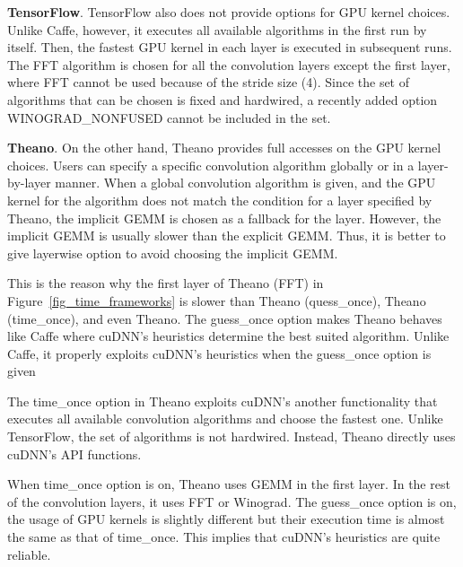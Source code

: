 {\bf TensorFlow}. TensorFlow also does not provide options for GPU kernel choices. Unlike Caffe, however, it executes all available algorithms in the first run by itself. Then, the fastest GPU kernel in each layer is executed in subsequent runs. The FFT algorithm is chosen for all the convolution layers except the first layer, where FFT cannot be used because of the stride size (4). Since the set of algorithms that can be chosen is fixed and hardwired, a recently added option WINOGRAD\_NONFUSED cannot be included in the set.

{\bf Theano}. On the other hand, Theano provides full accesses on the GPU kernel choices. Users can specify a specific convolution algorithm globally or in a layer-by-layer manner.  When a global convolution algorithm is given, and the GPU kernel for the algorithm does not match the condition for a layer specified by Theano, the implicit GEMM is chosen as a fallback for the layer. However, the implicit GEMM is usually slower than the explicit GEMM. Thus, it is better to give layerwise option to avoid choosing the implicit GEMM.

This is the reason why the first layer of \textsf{Theano (FFT)} in Figure~\ref{fig_time_frameworks} is slower than \textsf{Theano (quess\_once)}, \textsf{Theano (time\_once)}, and even \textsf{Theano}. The \textsf{guess\_once} option makes Theano behaves like Caffe where cuDNN's heuristics determine the best suited algorithm. Unlike Caffe, it properly exploits cuDNN's heuristics when the \textsf{guess\_once} option is given 

The \textsf{time\_once} option in Theano exploits cuDNN's another functionality that executes all available convolution algorithms and choose the fastest one. Unlike TensorFlow, the set of algorithms is not hardwired. Instead, Theano directly uses cuDNN's API functions.

When \textsf{time\_once} option is on, Theano uses GEMM in the first layer. In the rest of the convolution layers, it uses FFT or Winograd. The \textsf{guess\_once} option is on, the usage of GPU kernels is slightly different but their execution time is almost the same as that of \textsf{time\_once}.
This implies that cuDNN's heuristics are quite reliable.

